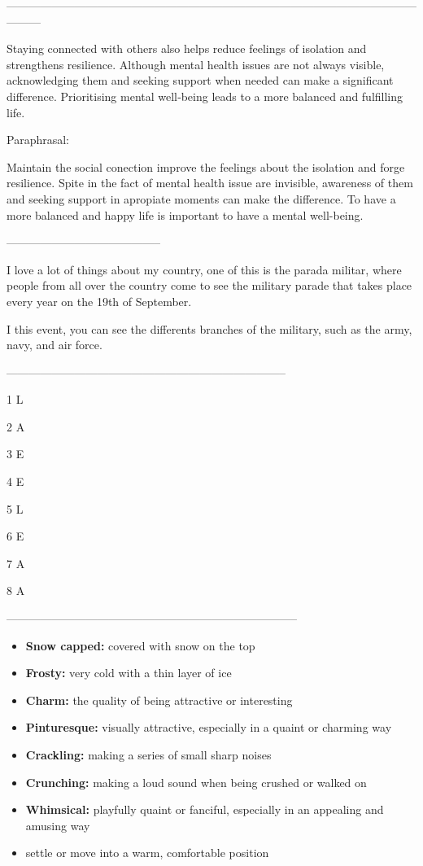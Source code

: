 ---------------------------------------------------------------------------------------------------------------------


Staying connected with others also helps reduce feelings of isolation and strengthens resilience. Although mental health issues are not always visible, acknowledging them and seeking support when needed can make a significant difference. Prioritising mental well‑being leads to a more balanced and fulfilling life.

Paraphrasal:

Maintain the social conection improve the feelings about the isolation and forge resilience. Spite in the fact of mental health issue are invisible, awareness of them and seeking support in apropiate moments can make the difference. To have a more balanced and happy life is important to have a mental well-being.



-----------------------------------------


I love a lot of things about my country, one of this is the parada militar, where people from all over the country come to see the military parade that takes place every year on the 19th of September.

I this event, you can see the differents branches of the military, such as the army, navy, and air force. 

--------------------------------------------------------------------------


1 L

2 A

3 E

4 E

5 L

6 E

7 A

8 A



-----------------------------------------------------------------------------


\begin{itemize}
    \item \textbf{Snow capped:} covered with snow on the top
    \item \textbf{Frosty:} very cold with a thin layer of ice 
    \item \textbf{Charm:} the quality of being attractive or interesting
    \item \textbf{Pinturesque:} visually attractive, especially in a quaint or charming way
    \item \textbf{Crackling:} making a series of small sharp noises
    \item \textbf{Crunching:} making a loud sound when being crushed or walked on
    \item \textbf{Whimsical:} playfully quaint or fanciful, especially in an appealing and amusing way
    \item {} settle or move into a warm, comfortable position
\end{itemize}




